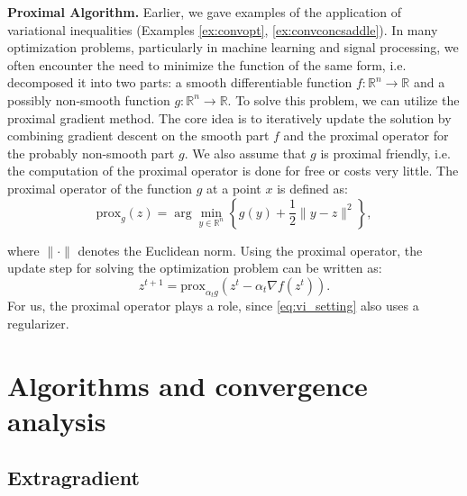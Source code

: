 \documentclass{article}
\begin{document}
\textbf{Proximal Algorithm.}
Earlier, we gave examples of the application of variational inequalities (Examples \ref{ex:convopt}, \ref{ex:convconcsaddle}). In many optimization problems, particularly in machine learning and signal processing, we often encounter the need to minimize the function of the same form, i.e. decomposed it into two parts: a smooth differentiable function \( f : \mathbb{R}^n \rightarrow \mathbb{R} \) and a possibly non-smooth function \( g : \mathbb{R}^n \rightarrow \mathbb{R} \). To solve this problem, we can utilize the proximal gradient method. The core idea is to iteratively update the solution by combining gradient descent on the smooth part \( f \) and the proximal operator for the probably non-smooth part \( g \). We also assume that $g$ is proximal friendly, i.e. the computation of the proximal operator is done for free or costs very little. The proximal operator of the function \( g \) at a point \( x \) is defined as:
\begin{equation*}
\text{prox}_{g}(z) = \arg\min_{y \in \mathbb{R}^n} \left\{ g(y) + \frac{1}{2} \| y - z \|^2 \right\},
\end{equation*}
\vspace{-2mm}

where \( \| \cdot \| \) denotes the Euclidean norm.
Using the proximal operator, the update step for solving the optimization problem can be written as:
\begin{equation*}
z^{t+1} = \text{prox}_{\alpha_t g}\left( z^t - \alpha_t \nabla f(z^t) \right).
\end{equation*}
For us, the proximal operator plays a role, since \eqref{eq:vi_setting} also uses a regularizer.

\section{Algorithms and convergence analysis}
\subsection{Extragradient}
\end{document}
